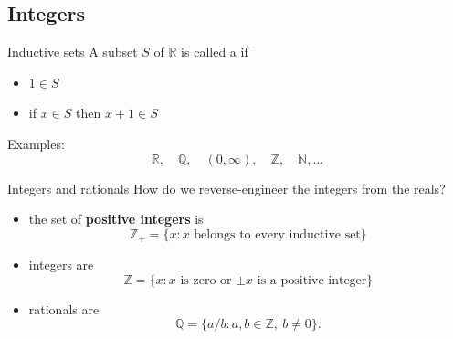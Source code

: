 \documentclass{beamer}
\begin{document}
\subsection{Integers}

\begin{frame}{Inductive sets}
A subset $S$ of $\mathbb{R}$ is called a  if
\begin{itemize}
\item $1\in S$
\item if $x\in S$ then $x+1\in S$ 
\end{itemize}
\pause
Examples:
$$\mathbb{R},\quad\mathbb{Q},\quad(0,\infty),\quad\mathbb{Z},\quad\mathbb{N},\dots$$
\end{frame}

\begin{frame}{Integers and rationals}
How do we reverse-engineer the integers from the reals?
\begin{itemize}
\pause
\item the set of \textbf{positive integers} is
$$\mathbb{Z}_+ = \{x: \text{$x$ belongs to every inductive set}\}$$
\pause
\item integers are
$$\mathbb{Z} = \{x: \text{$x$ is zero or $\pm x$ is a positive integer}\}$$
\pause
\item rationals are
$$\mathbb{Q} = \{a/b: a,b\in\mathbb{Z},\ b\neq 0\}.$$
\end{itemize}
\end{frame}
\end{document}
